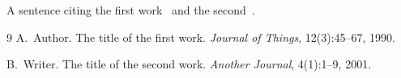\documentclass{article}
\begin{document}
A sentence citing the first work~\cite{a} and the second~\cite{b}.

\begin{thebibliography}{9}
A.~Author.
\newblock The title of the first work.
\newblock \emph{Journal of Things}, 12(3):45--67, 1990.

B.~Writer.
\newblock The title of the second work.
\newblock \emph{Another Journal}, 4(1):1--9, 2001.
\end{thebibliography}
\end{document}

